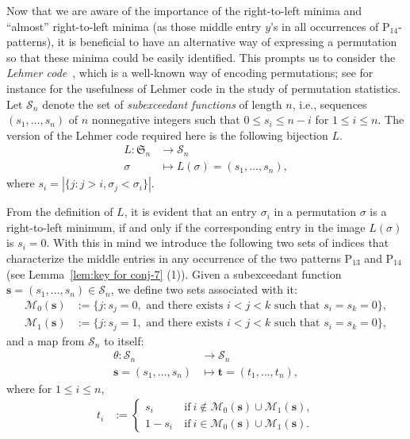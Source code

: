 \documentclass[12pt,reqno]{article}
\numberwithin{equation}{section}
\theoremstyle{plain}
\theoremstyle{definition}
\def\fS{\mathfrak{S}}
\def\rP{\mathrm{P}}
\def\cS{\mathcal{S}}
\def\cN{\mathcal{M}}
\def\bs{\mathbf{s}}
\def\bt{\mathbf{t}}
\begin{document}
Now that we are aware of the importance of the right-to-left minima and ``almost'' right-to-left minima (as those middle entry $y$'s in all occurrences of $\rP_{14}$-patterns), it is beneficial to have an alternative way of expressing a permutation so that these minima could be easily identified. This prompts us to consider the {\it Lehmer code}~\cite{Lem60}, which is a well-known way of encoding permutations; see for instance \cite{Vaj13} for the usefulness of Lehmer code in the study of permutation statistics. Let $\cS_n$ denote the set of {\it subexceedant functions} of length $n$, i.e., sequences $(s_1,\ldots,s_n)$ of $n$ nonnegative integers such that $0\le s_i\le n-i$ for $1\le i\le n$. The version of the Lehmer code required here is the following bijection $L$.
\begin{align*}
L: \fS_n &\to \cS_n \\
\sigma &\mapsto L(\sigma)=(s_1,\ldots,s_n),
\end{align*}
where $s_i=|\{j: j>i, \sigma_j < \sigma_i\}|$.

From the definition of $L$, it is evident that an entry $\sigma_i$ in a permutation $\sigma$ is a right-to-left minimum, if and only if the corresponding entry in the image $L(\sigma)$ is $s_i=0$. With this in mind we introduce the following two sets of indices that characterize the middle entries in any occurrence of the two patterns $\rP_{13}$ and $\rP_{14}$ (see Lemma~\ref{lem:key for conj-7} (1)). Given a subexceedant function $\bs=(s_1,\ldots,s_n)\in\cS_n$, we define two sets associated with it:
\begin{align*}
\cN_0(\bs) &:=\{j: s_j=0, \text{ and there exists $i<j<k$ such that $s_i=s_k=0$}\},\\
\cN_1(\bs) &:=\{j: s_j=1, \text{ and there exists $i<j<k$ such that $s_i=s_k=0$}\},
\end{align*}
and a map from $\cS_n$ to itself:
\begin{align*}
\theta: \cS_n &\to \cS_n \\
\bs=(s_1,\ldots,s_n) &\mapsto \bt=(t_1,\ldots,t_n),
\end{align*}
where for $1\le i\le n$,
\begin{align*}
t_i &:=\begin{cases}
		s_i & ~ \text{if}~ i \notin \cN_0(\bs)\cup \cN_1(\bs),\\ 
		1-s_i & ~ \text{if}~ i \in \cN_0(\bs)\cup \cN_1(\bs).
		\end{cases}
\end{align*}
\end{document}
